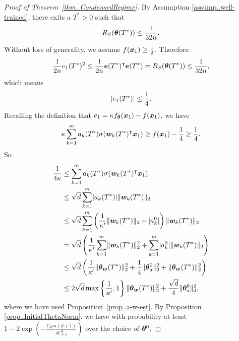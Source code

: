 \documentclass{article}
\begin{document}
\begin{proof}[Proof of Theorem~\ref{thm..CondensedRegime}]
    By Assumption \ref{assump..well-trained}, there exits a $T^*>0$ such that
    \begin{equation*}
        R_S(\bm{\theta}(T^*))\leq \frac{1}{32n}.
    \end{equation*}
    Without loss of generality, we assume $f(\bm{x}_1)\geq \frac{1}{2}$.
    Therefore
    \begin{equation*}
        \frac{1}{2n}e_1(T^*)^2\leq \frac{1}{2n}\bm{e}(T^*)^\intercal\bm{e}(T^*)=R_S(\bm{\theta}(T^*))\leq\frac{1}{32n},
    \end{equation*}
    which means
    \begin{equation*}
        \lvert e_1(T^*)\rvert\leq \frac{1}{4}.
    \end{equation*}
    Recalling the definition that $e_1=\kappa f_{\bm{\theta}}(\bm{x}_1) - f(\bm{x}_1)$, we have
    \begin{equation*}
        \kappa\sum_{k=1}^m a_k(T^*)\sigma(\bm{w}_k(T^*)^\intercal\bm{x}_1) \geq f(\bm{x}_1) - \frac{1}{4} \geq \frac{1}{4}.
    \end{equation*}
    So
    \begin{equation*}
        \begin{aligned}
            \frac{1}{4\kappa}
             & \leq\sum_{k=1}^m a_k(T^*)\sigma(\bm{w}_k(T^*)^\intercal\bm{x}_1)                                        \\
             & \leq \sqrt{d}\sum_{k=1}^m\lvert a_k(T^*)\rvert\lVert\bm{w}_k(T^*)\rVert_2                                 \\
             & \leq  \sqrt{d}\sum_{k=1}^m\left(\frac{1}{\kappa'}\lVert\bm{w}_k(T^*)\rVert_2+\lvert a_k^0\rvert\right)\lVert\bm{w}_k(T^*)\rVert_2\\
             & = \sqrt{d}\left(\frac{1}{\kappa'}\sum_{k=1}^m\lVert\bm{w}_k(T^*)\rVert_2^2+\sum_{k=1}^m\lvert a_k^0\rvert\lVert\bm{w}_k(T^*)\rVert_2\right)\\
             & \leq
             \sqrt{d}\left(\frac{1}{\kappa'}\lVert\bm{\theta}_{\bm{w}}(T^*)\rVert_2^2+\frac{1}{4}\lVert\bm{\theta}_{a}^0\rVert_2^2+\lVert\bm{\theta}_{\bm{w}}(T^*)\rVert_2^2\right)\\
             & \leq
             2\sqrt{d}\max\left\{\frac{1}{\kappa'},1\right\}\lVert\bm{\theta}_{\bm{w}}(T^*)\rVert_2^2+\frac{\sqrt{d}}{4}\lVert\bm{\theta}_{a}^0\rVert_2^2,
        \end{aligned}
    \end{equation*}
    where we have used Proposition~\ref{prop..a-w-est}.
    By Proposition \ref{prop..InitialThetaNorm}, we have with probability at least $1-2\exp(-\frac{C_0m(d+1)}{4C_{\psi,1}^2})$ over the choice of $\bm{\theta}^0$,

\end{proof}
\end{document}
